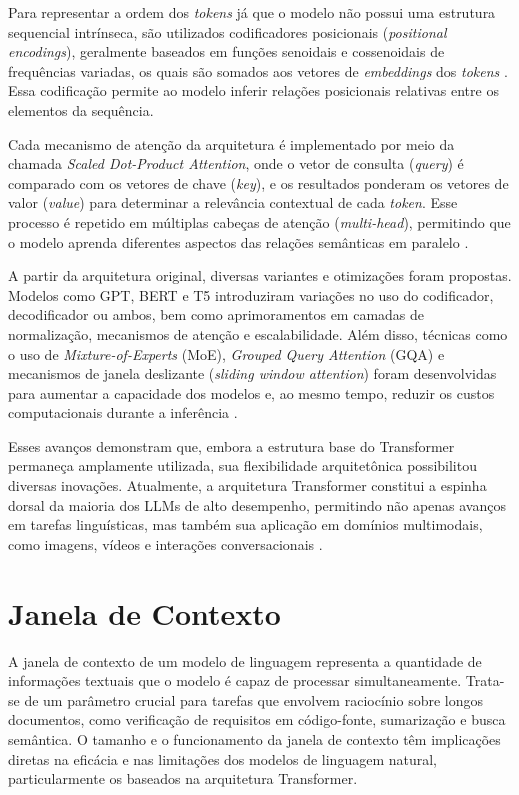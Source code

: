 Para representar a ordem dos \textit{tokens} já que o modelo não possui uma estrutura sequencial intrínseca, são utilizados codificadores posicionais (\textit{positional encodings}), geralmente baseados em funções senoidais e cossenoidais de frequências variadas, os quais são somados aos vetores de \textit{embeddings} dos \textit{tokens} . Essa codificação permite ao modelo inferir relações posicionais relativas entre os elementos da sequência.

Cada mecanismo de atenção da arquitetura é implementado por meio da chamada \textit{Scaled Dot-Product Attention}, onde o vetor de consulta (\textit{query}) é comparado com os vetores de chave (\textit{key}), e os resultados ponderam os vetores de valor (\textit{value}) para determinar a relevância contextual de cada \textit{token}. Esse processo é repetido em múltiplas cabeças de atenção (\textit{multi-head}), permitindo que o modelo aprenda diferentes aspectos das relações semânticas em paralelo \cite{ankit2024transformer, raschka2025bigllm}.

A partir da arquitetura original, diversas variantes e otimizações foram propostas. Modelos como GPT, BERT e T5 introduziram variações no uso do codificador, decodificador ou ambos, bem como aprimoramentos em camadas de normalização, mecanismos de atenção e escalabilidade. Além disso, técnicas como o uso de \textit{Mixture-of-Experts} (MoE), \textit{Grouped Query Attention} (GQA) e mecanismos de janela deslizante (\textit{sliding window attention}) foram desenvolvidas para aumentar a capacidade dos modelos e, ao mesmo tempo, reduzir os custos computacionais durante a inferência .

Esses avanços demonstram que, embora a estrutura base do Transformer permaneça amplamente utilizada, sua flexibilidade arquitetônica possibilitou diversas inovações. Atualmente, a arquitetura Transformer constitui a espinha dorsal da maioria dos LLMs de alto desempenho, permitindo não apenas avanços em tarefas linguísticas, mas também sua aplicação em domínios multimodais, como imagens, vídeos e interações conversacionais \cite{ankit2024transformer, raschka2025bigllm}.


\section{Janela de Contexto}

A janela de contexto de um modelo de linguagem representa a quantidade de informações textuais que o modelo é capaz de processar simultaneamente. Trata-se de um parâmetro crucial para tarefas que envolvem raciocínio sobre longos documentos, como verificação de requisitos em código-fonte, sumarização e busca semântica. O tamanho e o funcionamento da janela de contexto têm implicações diretas na eficácia e nas limitações dos modelos de linguagem natural, particularmente os baseados na arquitetura Transformer.

